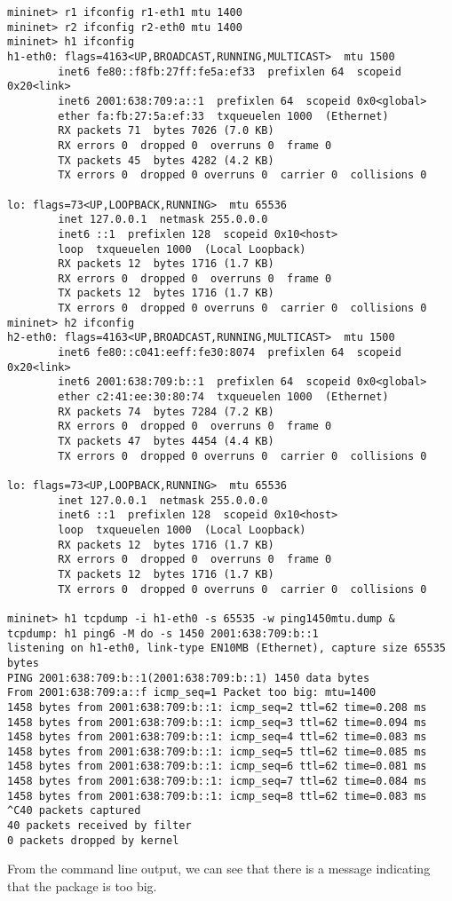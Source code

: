 \documentclass{article}
\begin{document}
\begin{verbatim}
mininet> r1 ifconfig r1-eth1 mtu 1400
mininet> r2 ifconfig r2-eth0 mtu 1400
mininet> h1 ifconfig
h1-eth0: flags=4163<UP,BROADCAST,RUNNING,MULTICAST>  mtu 1500
        inet6 fe80::f8fb:27ff:fe5a:ef33  prefixlen 64  scopeid 0x20<link>
        inet6 2001:638:709:a::1  prefixlen 64  scopeid 0x0<global>
        ether fa:fb:27:5a:ef:33  txqueuelen 1000  (Ethernet)
        RX packets 71  bytes 7026 (7.0 KB)
        RX errors 0  dropped 0  overruns 0  frame 0
        TX packets 45  bytes 4282 (4.2 KB)
        TX errors 0  dropped 0 overruns 0  carrier 0  collisions 0

lo: flags=73<UP,LOOPBACK,RUNNING>  mtu 65536
        inet 127.0.0.1  netmask 255.0.0.0
        inet6 ::1  prefixlen 128  scopeid 0x10<host>
        loop  txqueuelen 1000  (Local Loopback)
        RX packets 12  bytes 1716 (1.7 KB)
        RX errors 0  dropped 0  overruns 0  frame 0
        TX packets 12  bytes 1716 (1.7 KB)
        TX errors 0  dropped 0 overruns 0  carrier 0  collisions 0
mininet> h2 ifconfig
h2-eth0: flags=4163<UP,BROADCAST,RUNNING,MULTICAST>  mtu 1500
        inet6 fe80::c041:eeff:fe30:8074  prefixlen 64  scopeid 0x20<link>
        inet6 2001:638:709:b::1  prefixlen 64  scopeid 0x0<global>
        ether c2:41:ee:30:80:74  txqueuelen 1000  (Ethernet)
        RX packets 74  bytes 7284 (7.2 KB)
        RX errors 0  dropped 0  overruns 0  frame 0
        TX packets 47  bytes 4454 (4.4 KB)
        TX errors 0  dropped 0 overruns 0  carrier 0  collisions 0

lo: flags=73<UP,LOOPBACK,RUNNING>  mtu 65536
        inet 127.0.0.1  netmask 255.0.0.0
        inet6 ::1  prefixlen 128  scopeid 0x10<host>
        loop  txqueuelen 1000  (Local Loopback)
        RX packets 12  bytes 1716 (1.7 KB)
        RX errors 0  dropped 0  overruns 0  frame 0
        TX packets 12  bytes 1716 (1.7 KB)
        TX errors 0  dropped 0 overruns 0  carrier 0  collisions 0

mininet> h1 tcpdump -i h1-eth0 -s 65535 -w ping1450mtu.dump &
tcpdump: h1 ping6 -M do -s 1450 2001:638:709:b::1
listening on h1-eth0, link-type EN10MB (Ethernet), capture size 65535 bytes
PING 2001:638:709:b::1(2001:638:709:b::1) 1450 data bytes
From 2001:638:709:a::f icmp_seq=1 Packet too big: mtu=1400
1458 bytes from 2001:638:709:b::1: icmp_seq=2 ttl=62 time=0.208 ms
1458 bytes from 2001:638:709:b::1: icmp_seq=3 ttl=62 time=0.094 ms
1458 bytes from 2001:638:709:b::1: icmp_seq=4 ttl=62 time=0.083 ms
1458 bytes from 2001:638:709:b::1: icmp_seq=5 ttl=62 time=0.085 ms
1458 bytes from 2001:638:709:b::1: icmp_seq=6 ttl=62 time=0.081 ms
1458 bytes from 2001:638:709:b::1: icmp_seq=7 ttl=62 time=0.084 ms
1458 bytes from 2001:638:709:b::1: icmp_seq=8 ttl=62 time=0.083 ms
^C40 packets captured
40 packets received by filter
0 packets dropped by kernel
\end{verbatim}
From the command line output, we can see that there is a message indicating that
the package is too big.
\end{document}
